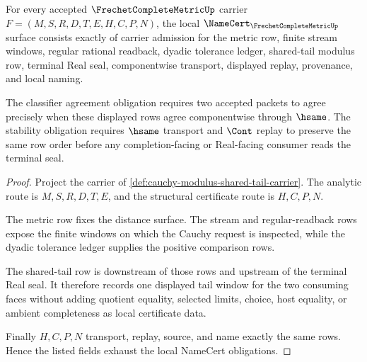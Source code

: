 \begin{theorem}
\label{thm:cauchy-modulus-shared-tail-namecert-obligations}
For every accepted $\FrechetCompleteMetricUp$ carrier $F=(M,S,R,D,T,E,H,C,P,N)$, the local $\NameCert_{\FrechetCompleteMetricUp}$ surface consists exactly of carrier admission for the metric row, finite stream windows, regular rational readback, dyadic tolerance ledger, shared-tail modulus row, terminal Real seal, componentwise transport, displayed replay, provenance, and local naming.

The classifier agreement obligation requires two accepted packets to agree precisely when these displayed rows agree componentwise through $\hsame$. The stability obligation requires $\hsame$ transport and $\Cont$ replay to preserve the same row order before any completion-facing or Real-facing consumer reads the terminal seal.
\end{theorem}
\begin{proof}
Project the carrier of \autoref{def:cauchy-modulus-shared-tail-carrier}. The analytic route is $M,S,R,D,T,E$, and the structural certificate route is $H,C,P,N$.

The metric row fixes the distance surface. The stream and regular-readback rows expose the finite windows on which the Cauchy request is inspected, while the dyadic tolerance ledger supplies the positive comparison rows.

The shared-tail row is downstream of those rows and upstream of the terminal Real seal. It therefore records one displayed tail window for the two consuming faces without adding quotient equality, selected limits, choice, host equality, or ambient completeness as local certificate data.

Finally $H,C,P,N$ transport, replay, source, and name exactly the same rows. Hence the listed fields exhaust the local NameCert obligations.
\end{proof}

